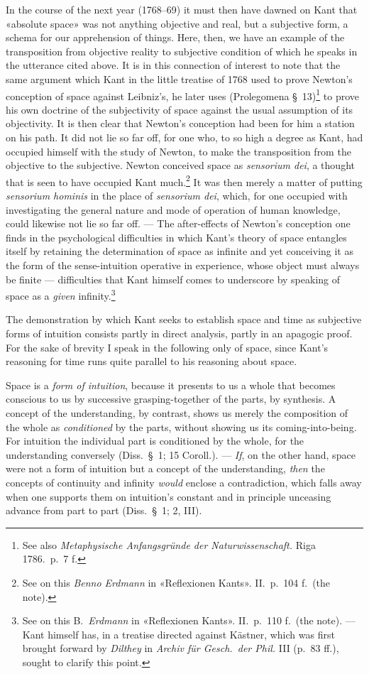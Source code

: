 \documentclass[12pt,a4paper]{article}
\newcommand{\opage}[1]{\marginnote{\footnotesize\textit{[#1]}}}
\begin{document}
In the course of the next year (1768--69) it must then have dawned on Kant
that «absolute space» was not anything objective and real, but a subjective
form, a schema for our apprehension of things. Here, then, we have an
example of the transposition from objective reality to subjective condition
of which he speaks in the utterance cited above. It is in this connection of
interest to note that the same argument which Kant in the little treatise of
1768 used to prove Newton's conception of space against Leibniz's, he later
uses (Prolegomena §\ 13)\footnote{See also \textit{Metaphysische
Anfangsgründe der Naturwissenschaft.} Riga 1786.\ p.\ 7 f.} to prove his
own doctrine of the subjectivity of space against the usual assumption of
its objectivity. It is then clear that Newton's conception had been for him
a station on his path. It did not lie so far off, for one who, to so high a
degree as Kant, had occupied himself with the study of Newton, to make the
transposition from the objective to the subjective. Newton conceived space
as \textit{sensorium dei}, a thought that is seen to have occupied Kant
much.\footnote{See on this \emph{Benno Erdmann} in «Reflexionen Kants». II.\ p.\
104 f.\ (the note).} It was then merely a matter of putting \textit{sensorium
hominis} in the place of \textit{sensorium dei}, which, for one occupied
with investigating the general nature and mode of operation of human
knowledge, could likewise not lie so far off. --- The after-effects of
Newton's conception one finds in the psychological difficulties in which
Kant's theory of space entangles itself by retaining the determination of
space as infinite and yet conceiving it as the form of the sense-intuition
operative in experience, whose object must always be finite ---
difficulties that Kant himself comes to underscore by speaking of space as
a \emph{given} infinity.\footnote{See on this B.\ \emph{Erdmann} in «Reflexionen Kants».
II.\ p.\ 110 f.\ (the note). --- Kant himself has, in a treatise directed
against Kästner, which was first brought forward by \emph{Dilthey} in \textit{Archiv
für Gesch.\ der Phil.} III (p.\ 83 ff.), sought to clarify this point.}

The demonstration by which Kant seeks to establish space and time as
subjective forms of intuition consists partly in direct analysis, partly in
an apagogic proof. For the sake of brevity I speak in the following only of
space, since Kant's reasoning for time runs quite parallel to his reasoning
about space.

Space is a \emph{form of intuition}, because it presents to us a whole that
becomes \opage{49}conscious to us by successive grasping-together of the parts, by
synthesis. A concept of the understanding, by contrast, shows us merely the
composition of the whole as \emph{conditioned} by the parts, without showing us its
coming-into-being. For intuition the individual part is conditioned by the
whole, for the understanding conversely (Diss.\ §\ 1; 15 Coroll.). --- \emph{If},
on the other hand, space were not a form of intuition but a concept of the
understanding, \emph{then} the concepts of continuity and infinity \emph{would} enclose a
contradiction, which falls away when one supports them on intuition's
constant and in principle unceasing advance from part to part (Diss.\ §\ 1;
2, III).
\end{document}
